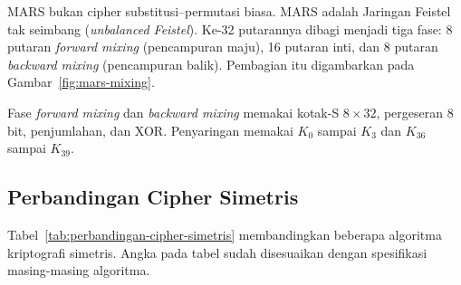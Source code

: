 MARS bukan cipher substitusi--permutasi biasa. MARS adalah Jaringan Feistel tak
seimbang (\textit{unbalanced Feistel}). Ke-32 putarannya dibagi menjadi tiga
fase: 8 putaran \textit{forward mixing} (pencampuran maju), 16 putaran inti, dan
8 putaran \textit{backward mixing} (pencampuran balik). Pembagian itu digambarkan
pada Gambar~\ref{fig:mars-mixing}.



Fase \textit{forward mixing} dan \textit{backward mixing} memakai kotak-S
$8 \times 32$, pergeseran 8 bit, penjumlahan, dan XOR. Penyaringan memakai
$K_0$ sampai $K_3$ dan $K_{36}$ sampai $K_{39}$.

\subsection{Perbandingan Cipher Simetris}

Tabel~\ref{tab:perbandingan-cipher-simetris} membandingkan beberapa algoritma
kriptografi simetris. Angka pada tabel sudah disesuaikan dengan spesifikasi
masing-masing algoritma.

